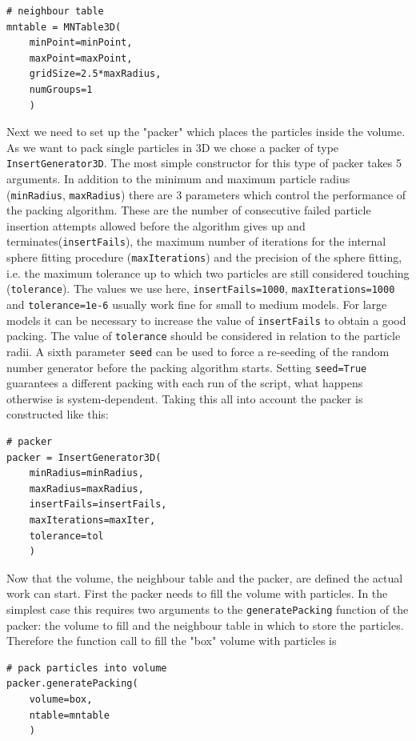 \begin{verbatim}
# neighbour table 
mntable = MNTable3D(
    minPoint=minPoint,
    maxPoint=maxPoint,
    gridSize=2.5*maxRadius,
    numGroups=1
    )
\end{verbatim}
Next we need to set up the "packer" which places the particles inside the volume. As we want to pack single particles in 3D we chose a packer of type \texttt{InsertGenerator3D}. The most simple constructor for this type of packer takes 5 arguments. In addition to the minimum and maximum particle radius (\texttt{minRadius}, \texttt{maxRadius}) there are 3 parameters which control the performance of the packing algorithm. These are the number of consecutive failed particle insertion attempts allowed before the algorithm gives up and terminates(\texttt{insertFails}), the maximum number of iterations for the internal sphere fitting procedure (\texttt{maxIterations}) and the precision of the sphere fitting, i.e. the maximum tolerance up to which two particles are still considered touching (\texttt{tolerance}). The values we use here, \texttt{insertFails=1000}, \texttt{maxIterations=1000} and \texttt{tolerance=1e-6} usually work fine for small to medium models. For large models it can be necessary to increase the value of \texttt{insertFails} to obtain a good packing. The value of \texttt{tolerance} should be considered in relation to the particle radii. A sixth parameter \texttt{seed} can be used to force a re-seeding of the random number generator before the packing algorithm starts.  Setting \texttt{seed=True} guarantees a different packing with each run of the script, what happens otherwise is system-dependent. Taking this all into account the packer is constructed like this:
\begin{verbatim}
# packer
packer = InsertGenerator3D(
    minRadius=minRadius,
    maxRadius=maxRadius,
    insertFails=insertFails,
    maxIterations=maxIter,
    tolerance=tol
    )
\end{verbatim}
Now that the volume, the neighbour table and the packer, are defined the actual work can start. First the packer needs to fill the volume with particles. In the simplest case this requires two arguments to the \texttt{generatePacking} function of the packer: the volume to fill and the neighbour table in which to store the particles. Therefore the function call to fill the "box" volume with particles is
\begin{verbatim}
# pack particles into volume
packer.generatePacking(
    volume=box,
    ntable=mntable
    )
\end{verbatim} 
